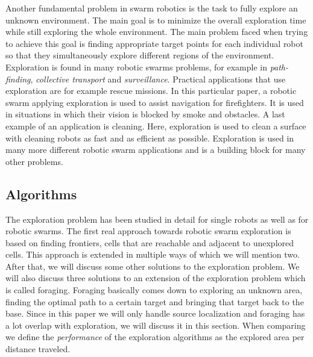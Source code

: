 
Another fundamental problem in swarm robotics is the task to fully explore an unknown environment.
The main goal is to minimize the overall exploration time while still exploring the whole environment. 
The main problem faced when trying to achieve this goal is finding appropriate target points for each individual robot so that they simultaneously explore different regions of the environment. \cite{burgard2005coordinated} \\
Exploration is found in many robotic swarms problems, for example in \emph{path-finding}, \emph{collective transport} and \emph{surveillance}.
Practical applications that use exploration are for example rescue missions. \cite{Naghsh2008,Penders2011}
In this particular paper, a robotic swarm applying exploration is used to assist navigation for firefighters.
It is used in situations in which their vision is blocked by smoke and obstacles. 
A last example of an application is cleaning. \cite{wagner2008cooperative}
Here, exploration is used to clean a surface with cleaning robots as fast and as efficient as possible. 
Exploration is used in many more different robotic swarm applications and is a building block for many other problems.

 

\subsection{Algorithms}
The exploration problem has been studied in detail for single robots \cite{lee1997quantitative,albers1999exploring} as well as for robotic swarms.
The first real approach towards robotic swarm exploration is based on finding frontiers, cells that are reachable and adjacent to unexplored cells. \cite{yamauchi1998frontier} This approach is extended in multiple ways of which we will mention two. \cite{solanas2004coordinated,sheng2006distributed}
After that, we will discuss some other solutions to the exploration problem. \cite{singh1993map,zlot2002multi}
We will also discuss three solutions to an extension of the exploration problem which is called foraging. \cite{jung2010multi,hoff2010two}
Foraging basically comes down to exploring an unknown area, finding the optimal path to a certain target and bringing that target back to the base.
Since in this paper we will only handle source localization and foraging has a lot overlap with exploration, we will discuss it in this section.
When comparing we define the \emph{performance} of the exploration algorithms as the explored area per distance traveled.

